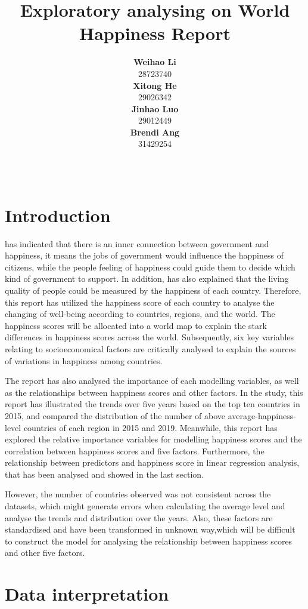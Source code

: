 \documentclass[11pt,a4paper,]{article}
\title{Exploratory analysing on World Happiness Report}
\author{\sf\Large\textbf{ Weihao Li}\\ {\sf\large 28723740\\[0.5cm]} \sf\Large\textbf{ Xitong He}\\ {\sf\large 29026342\\[0.5cm]} \sf\Large\textbf{ Jinhao Luo}\\ {\sf\large 29012449\\[0.5cm]} \sf\Large\textbf{ Brendi Ang}\\ {\sf\large 31429254\\[0.5cm]}}
\date{\sf\Date~\Month~\Year}
\makeatletter
\def\titlepage{\front{\expandafter{\@title}}{\@author}{\@organization}}
\makeatother
\begin{document}
\titlepage

\clearpage

\hypertarget{introduction}{%
\section{Introduction}\label{introduction}}

\textcite{helliwell2019world} has indicated that there is an inner connection between government and happiness, it means the jobs of government would influence the happiness of citizens, while the people feeling of happiness could guide them to decide which kind of government to support. In addition, \textcite{helliwell2019world} has also explained that the living quality of people could be measured by the happiness of each country. Therefore, this report has utilized the happiness score of each country to analyse the changing of well-being according to countries, regions, and the world. The happiness scores will be allocated into a world map to explain the stark differences in happiness scores across the world. Subsequently, six key variables relating to socioeconomical factors are critically analysed to explain the sources of variations in happiness among countries.

The report has also analysed the importance of each modelling variables, as well as the relationships between happiness scores and other factors. In the study, this report has illustrated the trends over five years based on the top ten countries in 2015, and compared the distribution of the number of above average-happiness-level countries of each region in 2015 and 2019. Meanwhile, this report has explored the relative importance variables for modelling happiness scores and the correlation between happiness scores and five factors. Furthermore, the relationship between predictors and happiness score in linear regression analysis, that has been analysed and showed in the last section.

However, the number of countries observed was not consistent across the datasets, which might generate errors when calculating the average level and analyse the trends and distribution over the years. Also, these factors are standardised and have been transformed in unknown way,which will be difficult to construct the model for analysing the relationship between happiness scores and other five factors.

\clearpage

\hypertarget{data-interpretation}{%
\section{Data interpretation}\label{data-interpretation}}
\end{document}
